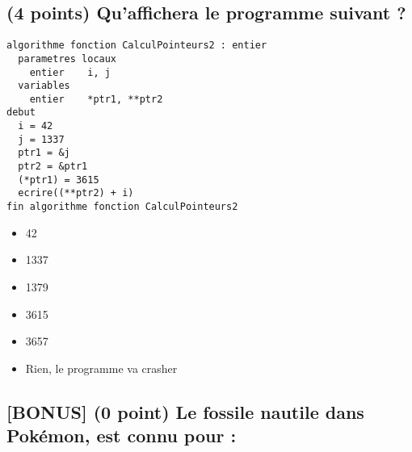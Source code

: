 \documentclass[11pt,a4paper]{article}
\begin{document}
\subsection{(4 points) Qu'affichera le programme suivant ? }

\begin{lstlisting}[style=algorithmique]
algorithme fonction CalculPointeurs2 : entier
  parametres locaux
    entier    i, j
  variables
    entier    *ptr1, **ptr2
debut
  i = 42
  j = 1337
  ptr1 = &j
  ptr2 = &ptr1
  (*ptr1) = 3615
  ecrire((**ptr2) + i)
fin algorithme fonction CalculPointeurs2
\end{lstlisting}

\begin{table}[ht!]
  \centering
  \begin{minipage}{0.45\textwidth}
    \centering
\begin{itemize}
  \item[\CaseCoche] 42 \\  
  \item[\CaseCoche] 1337 \\
  \item[\CaseCoche] 1379 \\
\end{itemize}
  \end{minipage}
  \hfillx
  \begin{minipage}{0.45\textwidth}
    \centering
\begin{itemize}
  \item[\CaseCoche] 3615 \\
  \item[\CaseCoche] 3657 \\  
  \item[\CaseCoche] Rien, le programme va crasher \\
\end{itemize}
  \end{minipage}
\end{table}


\bigskip

\subsection{[BONUS] (0 point) Le fossile nautile dans Pokémon, est connu pour : }
\end{document}
